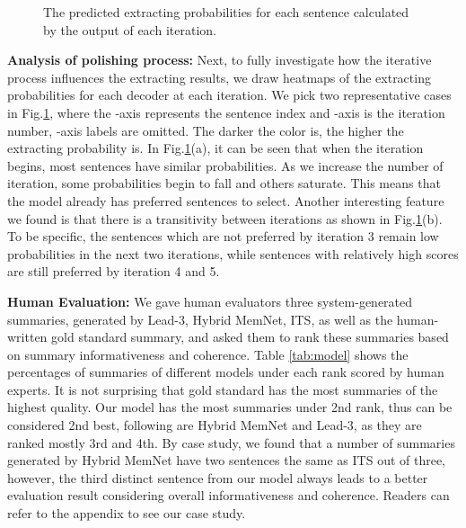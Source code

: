 \documentclass[11pt,a4paper]{article}
\begin{document}
\begin{figure} 
	\setlength{\abovecaptionskip}{0.cm}
	
	\setlength{\belowcaptionskip}{-0.cm}
	\setlength{\abovecaptionskip}{0.cm}
	
	\setlength{\belowcaptionskip}{-0.cm}
	\centering
	\caption{\label{fig:logits} The predicted extracting probabilities for each sentence calculated by the output of each iteration.} 
\end{figure}

\textbf{Analysis of polishing process:}
Next, to fully investigate how the iterative process influences the extracting results, we draw heatmaps of the extracting probabilities for each decoder at each iteration. We pick two representative cases in Fig.\ref{fig:logits}, where the -axis represents the sentence index and -axis is the iteration number, -axis labels are omitted.
The darker the color is, the higher the extracting probability is. 
In Fig.\ref{fig:logits}(a), it can be seen that when the iteration begins, most sentences have similar probabilities.
As we increase the number of iteration, some probabilities begin to fall and others saturate. This means that the model already has preferred sentences to select.
Another interesting feature we found is that there is a transitivity between iterations as shown in Fig.\ref{fig:logits}(b). 
To be specific, the sentences which are not preferred by iteration 3 remain low probabilities in the next two iterations, while sentences with relatively high scores are still preferred by iteration 4 and 5.








\textbf{Human Evaluation:}
We gave human evaluators three system-generated summaries, generated by Lead-3, Hybrid MemNet, ITS, as well as the human-written gold standard summary, and asked them to rank these summaries based on summary informativeness and coherence. Table \ref{tab:model}  shows the percentages of summaries of different models under each rank scored by human experts.  
It is not surprising that gold standard has the most summaries of the highest quality. 
Our model has the most summaries under 2nd rank, thus can be considered 2nd best, following are Hybrid MemNet and Lead-3, as they are ranked mostly 3rd and 4th.
By case study, we found that a number of summaries generated by Hybrid MemNet have two sentences the same as ITS out of three, however, the third distinct sentence from our model always leads to a better evaluation result considering overall informativeness and coherence.
Readers can refer to the appendix to see our case study.
\end{document}
